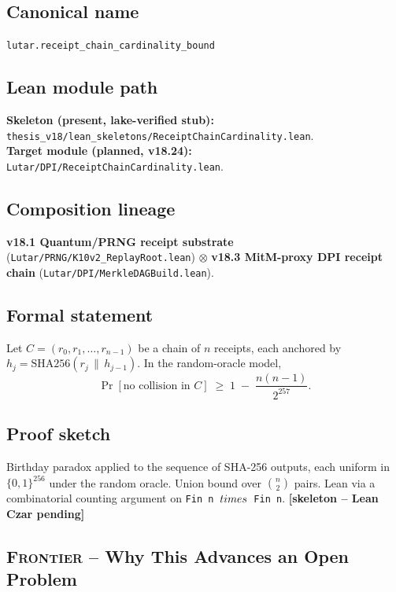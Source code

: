 \subsection*{Canonical name}
\verb|lutar.receipt_chain_cardinality_bound|

\subsection*{Lean module path}
\textbf{Skeleton (present, lake-verified stub):}
\texttt{thesis\_v18/lean\_skeletons/ReceiptChainCardinality.lean}.\\
\textbf{Target module (planned, v18.24):}
\texttt{Lutar/DPI/ReceiptChainCardinality.lean}.

\subsection*{Composition lineage}
\textbf{v18.1 Quantum/PRNG receipt substrate}
(\texttt{Lutar/PRNG/K10v2\_ReplayRoot.lean}) $\otimes$
\textbf{v18.3 MitM-proxy DPI receipt chain}
(\texttt{Lutar/DPI/MerkleDAGBuild.lean}).

\subsection*{Formal statement}

\begin{theorem}
\label{thm:receipt-chain-cardinality}
Let $C = (r_0, r_1, \dots, r_{n-1})$ be a chain of $n$ receipts,
each anchored by $h_j = \mathrm{SHA256}(r_j \,\|\, h_{j-1})$.
In the random-oracle model,
\[
  \Pr[\text{no collision in } C]
  \;\geq\;
  1 \;-\; \frac{n(n-1)}{2^{257}}.
\]
\end{theorem}

\subsection*{Proof sketch}

Birthday paradox applied to the sequence of SHA-256 outputs, each
uniform in $\{0,1\}^{256}$ under the random oracle.  Union bound
over $\binom{n}{2}$ pairs. Lean via a combinatorial counting argument
on \texttt{Fin n $\\times$ Fin n}. \hfill \textbf{[skeleton -- Lean Czar pending]}

\subsection*{\textsc{Frontier} -- Why This Advances an Open Problem}

